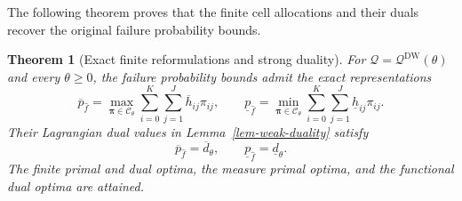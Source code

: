 \documentclass[review,11pt,3p,authoryear,nopreprintline]{elsarticle}
\newtheorem{theorem}{Theorem}
\begin{document}
The following theorem proves that the finite cell allocations and their duals recover the original failure probability bounds.

\begin{theorem}[Exact finite reformulations and strong duality]
  \label{thm-finite-dual-reformulations}
  For $\mathcal Q=\mathcal Q^{\mathrm{DW}}(\theta)$ and every $\theta\ge0$, the failure probability bounds admit the exact representations
  \begin{equation}
    \overline p_{\hat f}
      =\max_{\bm\pi\in\mathcal C_\theta}\sum_{i=0}^{K}\sum_{j=1}^{J}\overline h_{ij}\pi_{ij},
    \qquad
    \underline p_{\hat f}
      =\min_{\bm\pi\in\mathcal C_\theta}\sum_{i=0}^{K}\sum_{j=1}^{J}\underline h_{ij}\pi_{ij}.
    \label{eq-finite-primal-values}
  \end{equation}
  Their Lagrangian dual values in Lemma~\ref{lem-weak-duality} satisfy
  \begin{equation}
    \overline p_{\hat f}=\overline d_\theta,
    \qquad
    \underline p_{\hat f}=\underline d_\theta.
    \label{eq-strong-duality}
  \end{equation}
  The finite primal and dual optima, the measure primal optima, and the functional dual optima are attained.
\end{theorem}
\end{document}
